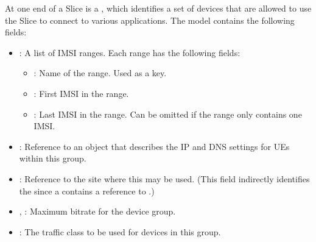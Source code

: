 \documentclass[a4paper,11pt,english]{sphinxmanual}
\begin{document}
\sphinxAtStartPar
At one end of a Slice is a , which identifies a set of
devices that are allowed to use the Slice to connect to various
applications. The  model contains the following fields:
\begin{itemize}
\item {} 
\sphinxAtStartPar
{}: A list of IMSI ranges. Each range has the following
fields:
\begin{itemize}
\item {} 
\sphinxAtStartPar
{}: Name of the range. Used as a key.

\item {} 
\sphinxAtStartPar
{}: First IMSI in the range.

\item {} 
\sphinxAtStartPar
{}: Last IMSI in the range. Can be omitted if
the range only contains one IMSI.

\end{itemize}

\item {} 
\sphinxAtStartPar
{}: Reference to an  object that describes the
IP and DNS settings for UEs within this group.

\item {} 
\sphinxAtStartPar
{}: Reference to the site where this  may be
used. (This field indirectly identifies the  since a
 contains a reference to .)

\item {} 
\sphinxAtStartPar
{}, : Maximum bit\sphinxhyphen{}rate for the device group.

\item {} 
\sphinxAtStartPar
{}: The traffic class to be used for devices in this group.

\end{itemize}
\end{document}
